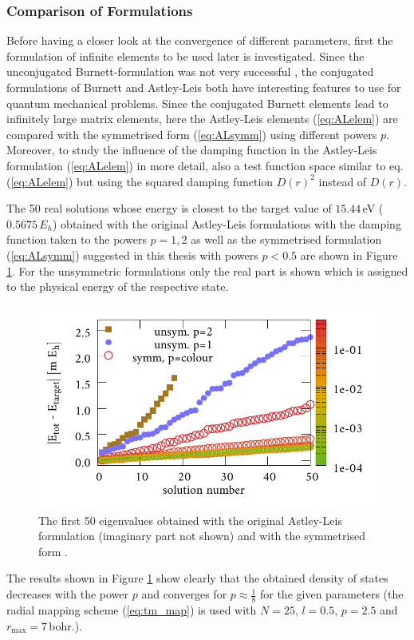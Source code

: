 \subsubsection{Comparison of Formulations}
\label{ch:bmFormul}
Before having a closer look at the convergence of different parameters, first the formulation of infinite elements to be used later is investigated.
Since the unconjugated Bur\-nett-formulation was not very successful \cite{dreyer}, the conjugated formulations of Burnett and Astley-Leis both have interesting features to use for quantum mechanical problems.
Since the conjugated Burnett elements lead to infinitely large matrix elements, here the Astley-Leis elements (\ref{eq:ALelem}) are compared with the symmetrised form (\ref{eq:ALsymm}) using different powers $p$.
Moreover, to study the influence of the damping function in the Astley-Leis formulation (\ref{eq:ALelem}) in more detail, also a test function space similar to eq. (\ref{eq:ALelem}) but using the squared damping function $D(r)^2$ instead of $D(r)$.

The 50 real solutions whose energy is closest to the target value of $15.44\,$eV ($0.5675\,E_h$) obtained with the original Astley-Leis formulations with the damping function taken to the powers $p=1,2$ as well as the symmetrised formulation (\ref{eq:ALsymm}) suggested in this thesis with powers $p<0.5$ are shown in Figure \ref{fig:IFEMform_spect}.
For the unsymmetric formulations only the real part is shown which is assigned to the physical energy of the respective state.
\begin{figure}
\includegraphics[width=\textwidth]{Figures/IFem_form_spectra}
\caption{The first 50 eigenvalues obtained with the original Astley-Leis formulation (imaginary part not shown) and with the symmetrised form .}
\label{fig:IFEMform_spect}
\end{figure}
The results shown in Figure \ref{fig:IFEMform_spect} show clearly that the obtained density of states decreases with the power $p$ and converges for $p\approx \frac 18$ for the given parameters (the radial mapping scheme (\ref{eq:tm_map}) is used with $N=25$, $l=0.5$, $p=2.5$ and $r_\text{max}=7\,$bohr.).

